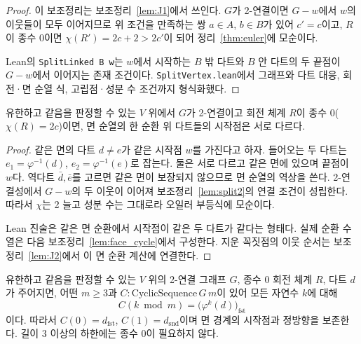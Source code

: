 \begin{proof}
이 보조정리는 보조정리~\ref{lem:J1}에서 쓰인다. \(G\)가 2-연결이면 \(G - w\)에서 \(w\)의 이웃들이 모두
이어지므로 위 조건을 만족하는 쌍 \(a \in A\), \(b \in B\)가 있어 \(c' = c\)이고, \(R\)이 종수 0이면 \(\chi(R') = 2c + 2 > 2c'\)이 되어
정리~\ref{thm:euler}에 모순이다.

Lean의 \texttt{SplitLinked B w}는 \(w\)에서 시작하는 \(B\) 밖 다트와 \(B\) 안 다트의 두 끝점이
\(G-w\)에서 이어지는 존재 조건이다. \texttt{SplitVertex.lean}에서 그래프와 다트 대응, 회전·면 순열 식,
고립점·성분 수 조건까지 형식화했다.
\end{proof}


\begin{lemma}
\label{lem:J1}
\leanok
유한하고 같음을 판정할 수 있는 \(V\) 위에서 \(G\)가 2-연결이고 회전 체계 \(R\)이 종수 0(\(\chi(R) = 2c\))이면, 면 순열의 한 순환 위 다트들의
시작점은 서로 다르다.
\end{lemma}

\begin{proof}
\leanok
같은 면의 다트 \(d\ne e\)가 같은 시작점 \(w\)를 가진다고 하자. 들어오는 두 다트는
\(e_1=\varphi^{-1}(d)\), \(e_2=\varphi^{-1}(e)\)로 잡는다. 둘은 서로 다르고 같은 면에 있으며 끝점이
\(w\)다. 역다트 \(\bar d,\bar e\)를 고르면 같은 면이 보장되지 않으므로 면 순열의 역상을 쓴다.
2-연결성에서 \(G-w\)의 두 이웃이 이어져 보조정리~\ref{lem:split2}의 연결 조건이 성립한다.
따라서 \(\chi\)는 2 늘고 성분 수는 그대로라 오일러 부등식에 모순이다.

Lean 진술은 같은 면 순환에서 시작점이 같은 두 다트가 같다는 형태다. 실제 순환 수열은 다음
보조정리~\ref{lem:face_cycle}에서 구성한다. 지운 꼭짓점의 이웃 순서는
보조정리~\ref{lem:J2}에서 이 면 순환 계산에 연결한다.
\end{proof}

\begin{lemma}
\label{lem:face_cycle}
\leanok
유한하고 같음을 판정할 수 있는 \(V\) 위의 2-연결 그래프 \(G\), 종수 0 회전 체계 \(R\), 다트 \(d\)가
주어지면, 어떤 \(m\ge3\)과 \(C:\mathrm{CyclicSequence}\,G\,m\)이 있어 모든 자연수 \(k\)에 대해
\[
 C(k\bmod m)=\bigl(\varphi^k(d)\bigr)_{\mathrm{fst}}
\]
이다. 따라서 \(C(0)=d_{\mathrm{fst}}\),
\(C(1)=d_{\mathrm{snd}}\)이며 면 경계의 시작점과 정방향을 보존한다. 길이 3 이상의 하한에는 종수 0이
필요하지 않다.
\end{lemma}

